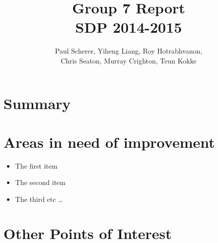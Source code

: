 \documentclass[12pt,a4paper]{article}
\begin{document}
\title{Group 7 Report\\
		SDP 2014-2015}
\author{Paul Scherer, Yiheng Liang, Roy Hotrabhvanon,\\Chris Seaton, Murray Crighton, Teun Kokke}
\maketitle

\section{Summary}

\section{Areas in need of improvement}

\begin{itemize}
  \item The first item
  \item The second item
  \item The third etc \ldots
\end{itemize}

\section{Other Points of Interest}
\end{document}
